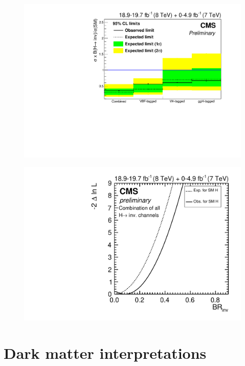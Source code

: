 \begin{figure}
  \includegraphics[width=\largefigwidth]{plots/comb/HIG-15-012-figs/channellimit.pdf}
  \caption{}%
  \label{fig:parkedcombchannel}
\end{figure}

\begin{figure}
  \includegraphics[width=\largefigwidth]{plots/comb/HIG-15-012-figs/combscan.pdf}
  \caption{}%
  \label{fig:parkedcombscan}
\end{figure}



\section{Dark matter interpretations}
\label{sec:dminterp}
